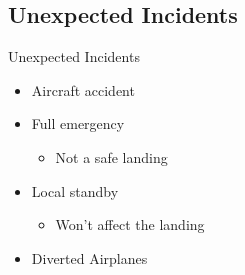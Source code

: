 \subsection{Unexpected Incidents}
\begin{frame}{Unexpected Incidents}{}
	\begin{itemize}
		\item Aircraft accident
		\item Full emergency
			\begin{itemize}
				\item Not a safe landing
			\end{itemize}
		\item Local standby
			\begin{itemize}
				\item Won't affect the landing
			\end{itemize}
		\item Diverted Airplanes
	\end{itemize}
\end{frame}